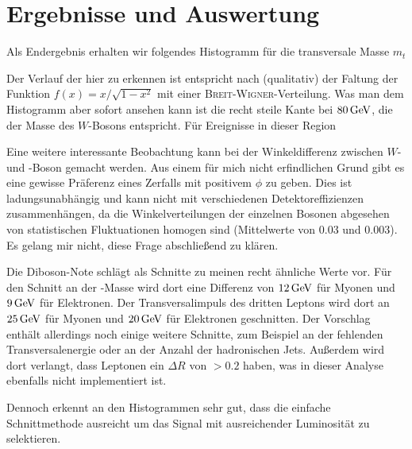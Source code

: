 \section{Ergebnisse und Auswertung}
Als Endergebnis erhalten wir folgendes Histogramm für die transversale Masse
$m_t$

\begin{center}
  
\end{center}

Der Verlauf der hier zu erkennen ist entspricht nach\cite{transv} (qualitativ)
der Faltung der Funktion $f(x) = x/\sqrt{1-x^2}$ mit einer
\textsc{Breit}-\textsc{Wigner}-Verteilung. Was man dem Histogramm aber sofort
ansehen kann ist die recht steile Kante bei $\unit[80]{GeV}$, die der Masse des
$W$-Bosons entspricht. Für Ereignisse in dieser Region 

Eine weitere interessante Beobachtung kann bei der Winkeldifferenz zwischen $W$-
und \Z-Boson gemacht werden. Aus einem für mich nicht erfindlichen Grund gibt es
eine gewisse Präferenz eines Zerfalls mit positivem $\phi$ zu geben. Dies ist
ladungsunabhängig und kann nicht mit verschiedenen Detektoreffizienzen
zusammenhängen, da die Winkelverteilungen der einzelnen Bosonen abgesehen von
statistischen Fluktuationen homogen sind (Mittelwerte von $0.03$ und $0.003$).
Es gelang mir nicht, diese Frage abschließend zu klären.

\begin{center}
  
\end{center}

Die Diboson-Note schlägt als Schnitte zu meinen recht ähnliche Werte vor. Für
den Schnitt an der \Z-Masse wird dort eine Differenz von $\unit[12]{GeV}$ für
Myonen und $\unit[9]{GeV}$ für Elektronen. Der Transversalimpuls des dritten
Leptons wird dort an $\unit[25]{GeV}$ für Myonen und $\unit[20]{GeV}$ für
Elektronen geschnitten. Der Vorschlag enthält allerdings noch einige weitere
Schnitte, zum Beispiel an der fehlenden Transversalenergie oder an der Anzahl
der hadronischen Jets. Außerdem wird dort verlangt, dass Leptonen ein $\Delta R$
von $> 0.2$ haben, was in dieser Analyse ebenfalls nicht implementiert ist.

Dennoch erkennt an den Histogrammen sehr gut, dass die einfache Schnittmethode
ausreicht um das Signal mit ausreichender Luminosität zu selektieren.
\newpage
